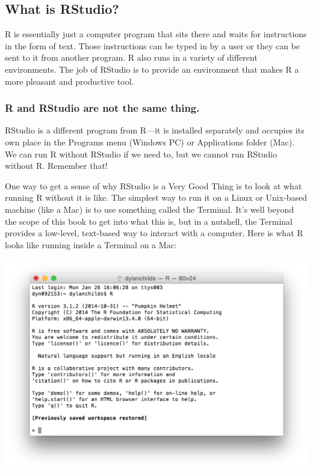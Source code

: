 \documentclass[
]{book}
\newenvironment{greybox}{
  \definecolor{shadecolor}{rgb}{0.95,0.95,0.95}  %
  \color{black}
  \begin{shaded}}
 {\end{shaded}}
\newenvironment{infobox}[1]
  {
  \begin{itemize}
  \renewcommand{\labelitemi}{
    \raisebox{-.7\height}[0pt][0pt]{
      {\setkeys{Gin}{width=3em,keepaspectratio}
        \texttt{[image: images/\#1]}}
    }
  }
  \setlength{\fboxsep}{1em}
  \begin{greybox}
  \item
  }
  {
  \end{greybox}
  \end{itemize}
  }
\begin{document}
\hypertarget{what-is-rstudio}{%
\subsection*{What is RStudio?}\label{what-is-rstudio}}

R is essentially just a computer program that sits there and waits for instructions in the form of text. Those instructions can be typed in by a user or they can be sent to it from another program. R also runs in a variety of different environments. The job of RStudio is to provide an environment that makes R a more pleasant and productive tool.

\begin{infobox}{warning}

\hypertarget{r-and-rstudio-are-not-the-same-thing.}{%
\subsubsection*{R and RStudio are not the same thing.}\label{r-and-rstudio-are-not-the-same-thing.}}

RStudio is a different program from R---it is installed separately and occupies its own place in the Programs menu (Windows PC) or Applications folder (Mac). We can run R without RStudio if we need to, but we cannot run RStudio without R. Remember that!

\end{infobox}

One way to get a sense of why RStudio is a Very Good Thing is to look at what running R without it is like. The simplest way to run it on a Linux or Unix-based machine (like a Mac) is to use something called the Terminal. It's well beyond the scope of this book to get into what this is, but in a nutshell, the Terminal provides a low-level, text-based way to interact with a computer. Here is what R looks like running inside a Terminal on a Mac:

\begin{center}\includegraphics[width=18.94in]{images/R-terminal} \end{center}
\end{document}
